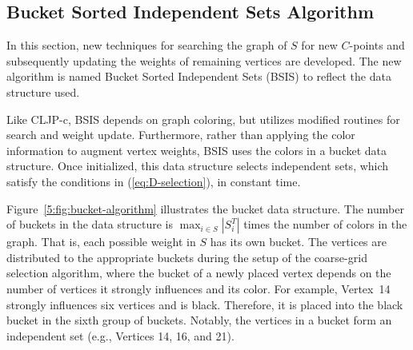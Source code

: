 \documentclass{elsart}
\begin{document}
\subsection{Bucket Sorted Independent Sets Algorithm}
\label{sec:bsis-alg}
In this section, new techniques for searching the graph of $S$ for new
$C$-points and subsequently updating the weights of remaining vertices
are developed. The new algorithm is named Bucket Sorted Independent
Sets (BSIS) to reflect the data structure used.

Like CLJP-c, BSIS depends on graph coloring, but utilizes modified
routines for search and weight update. Furthermore, rather than
applying the color information to augment vertex weights, BSIS uses
the colors in a bucket data structure. Once initialized, this data
structure selects independent sets, which satisfy the conditions in
(\ref{eq:D-selection}), in constant time.

Figure~\ref{5:fig:bucket-algorithm} illustrates the bucket data
structure. The number of buckets in the data structure is $\max_{i \in
S}|S_i^T|$ times the number of colors in the graph. That is, each
possible weight in $S$ has its own bucket. The vertices are
distributed to the appropriate buckets during the setup of the
coarse-grid selection algorithm, where the bucket of a newly placed
vertex depends on the number of vertices it strongly influences and
its color. For example, Vertex~14 strongly influences six vertices and
is black. Therefore, it is placed into the black bucket in the sixth
group of buckets. Notably, the vertices in a bucket form an
independent set (e.g., Vertices 14, 16, and 21).
\end{document}
